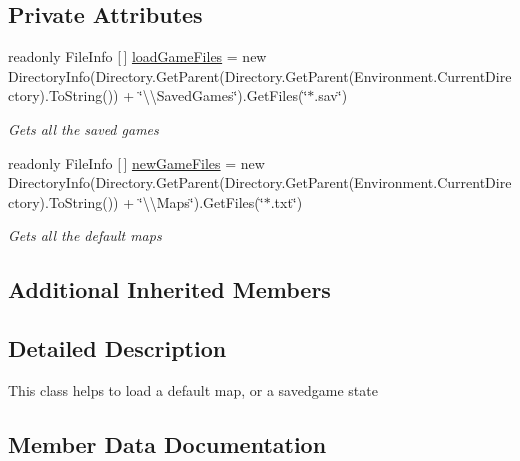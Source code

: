 \subsection*{Private Attributes}
\begin{DoxyCompactItemize}
\item 
readonly File\+Info \mbox{[}$\,$\mbox{]} \mbox{\hyperlink{class_bomberman_1_1_u_i_1_1_view_models_1_1_level_select_view_model_a3880117d88570199927af42d461828fb}{load\+Game\+Files}} = new Directory\+Info(Directory.\+Get\+Parent(Directory.\+Get\+Parent(Environment.\+Current\+Directory).To\+String()) + \char`\"{}\textbackslash{}\textbackslash{}Saved\+Games\char`\"{}).Get\+Files(\char`\"{}$\ast$.sav\char`\"{})
\begin{DoxyCompactList}\small\item\em Gets all the saved games \end{DoxyCompactList}\item 
readonly File\+Info \mbox{[}$\,$\mbox{]} \mbox{\hyperlink{class_bomberman_1_1_u_i_1_1_view_models_1_1_level_select_view_model_a35f10c80061120480536163aeb128580}{new\+Game\+Files}} = new Directory\+Info(Directory.\+Get\+Parent(Directory.\+Get\+Parent(Environment.\+Current\+Directory).To\+String()) + \char`\"{}\textbackslash{}\textbackslash{}Maps\char`\"{}).Get\+Files(\char`\"{}$\ast$.txt\char`\"{})
\begin{DoxyCompactList}\small\item\em Gets all the default maps \end{DoxyCompactList}\end{DoxyCompactItemize}
\subsection*{Additional Inherited Members}


\subsection{Detailed Description}
This class helps to load a default map, or a savedgame state 



\subsection{Member Data Documentation}
\mbox{\label{class_bomberman_1_1_u_i_1_1_view_models_1_1_level_select_view_model_a3880117d88570199927af42d461828fb}} 
